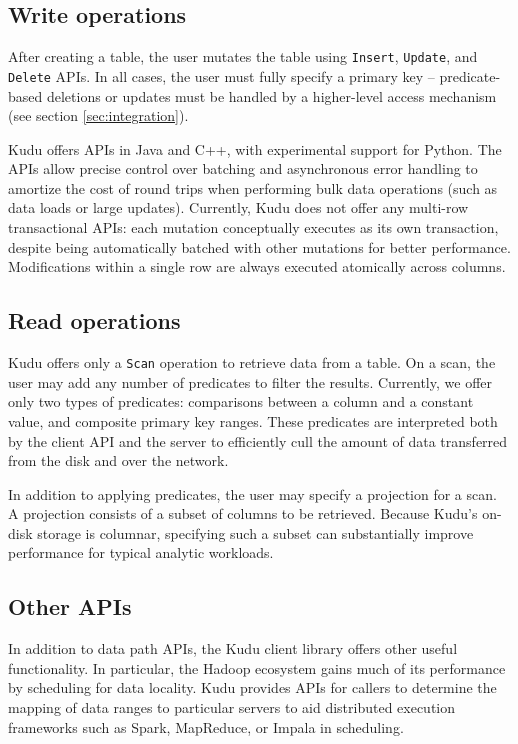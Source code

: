 \documentclass{vldb}
\begin{document}
\subsection{Write operations}
After creating a table, the user mutates the table using {\tt Insert}, {\tt Update}, and {\tt Delete}
APIs. In all cases, the user must fully specify a primary key -- predicate-based deletions or updates
must be handled by a higher-level access mechanism (see section {\ref{sec:integration}}).

Kudu offers APIs in Java and C++, with experimental support for Python. The APIs allow
precise control over batching and asynchronous error handling to amortize the cost of round trips
when performing bulk data operations (such as data loads or large updates). Currently, Kudu does
not offer any multi-row transactional APIs: each mutation conceptually executes as its own transaction,
despite being automatically batched with other mutations for better performance. Modifications within
a single row are always executed atomically across columns.

\subsection{Read operations}
Kudu offers only a {\tt Scan} operation to retrieve data from a table. On a scan, the user may add
any number of predicates to filter the results. Currently, we offer only two types of predicates:
comparisons between a column and a constant value, and composite primary key ranges. These
predicates are interpreted both by the client API and the server to efficiently cull the amount of
data transferred from the disk and over the network.

In addition to applying predicates, the user may specify a projection for a scan. A projection
consists of a subset of columns to be retrieved. Because Kudu's on-disk storage is columnar,
specifying such a subset can substantially improve performance for typical analytic workloads.

\subsection{Other APIs}
In addition to data path APIs, the Kudu client library offers other useful functionality. In particular,
the Hadoop ecosystem gains much of its performance by scheduling for data locality. Kudu provides
APIs for callers to determine the mapping of data ranges to particular servers to aid distributed
execution frameworks such as Spark, MapReduce, or Impala in scheduling.
\end{document}
